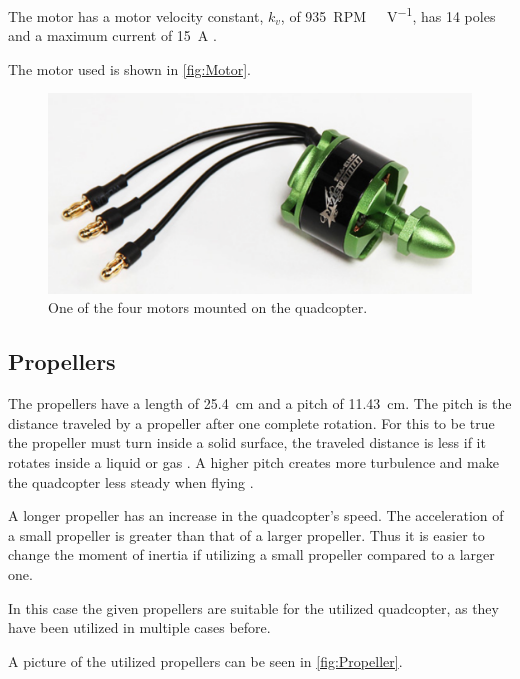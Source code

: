 The motor has a motor velocity constant, $k_v$, of \SI{935}{RPM\ V^{-1}}, has 14 poles and a maximum current of \SI{15}{A} \cite{HkingPropeller}.

The motor used is shown in \autoref{fig:Motor}.
\begin{figure}[H]
	\centering
	\includegraphics[scale=0.5]{figures/motor.png}
	\caption{One of the four motors mounted on the quadcopter.\cite{HkingPropeller}}
	\label{fig:Motor}
\end{figure} 

\subsection{Propellers}
The propellers have a length of \SI{25.4}{cm} and a pitch of \SI{11.43}{cm}. The pitch is the distance traveled by a propeller after one complete rotation. For this to be true the propeller must turn inside a solid surface, the traveled distance is less if it rotates inside a liquid or gas \cite{EReyes}. A higher pitch creates more turbulence and make the quadcopter less steady when flying \cite{oscarliang}.

A longer propeller has an increase in the quadcopter's speed. The acceleration of a small propeller is greater than that of a larger propeller. Thus it is easier to change the moment of inertia if utilizing a small propeller compared to a larger one. \cite{oscarliang}

In this case the given propellers are suitable for the utilized quadcopter, as they have been utilized in multiple cases before. 

A picture of the utilized propellers can be seen in \autoref{fig:Propeller}.

